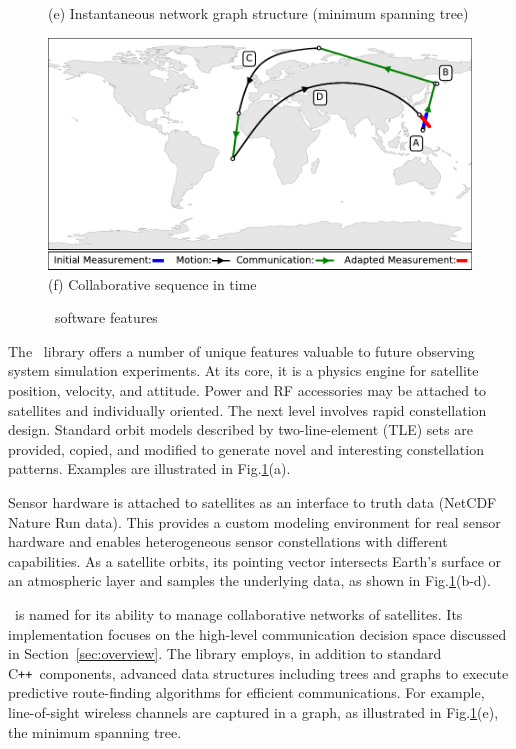 \documentclass[conference]{IEEEtran}
\newcommand{\project}{{\sc{Collaborate}}~}
\newcommand{\cpp}{C\texttt{++}~}
\begin{document}
\begin{figure}[b!]
\begin{minipage}[b]{\linewidth}
\begin{center}
      {\footnotesize(e) Instantaneous network graph structure (minimum spanning
        tree)}
    \end{center}
    \medskip
  \end{minipage}
  \begin{minipage}[b]{\linewidth}
    \begin{center}
      \includegraphics[width=\textwidth]{images/collaborate.pdf}
      {\footnotesize(f) Collaborative sequence in time}
    \end{center}
  \end{minipage}
  \caption{\project software features}
  \label{fig:features}
\end{figure}

The \project library offers a number of unique features valuable to future observing system simulation experiments.  At its core, it is a physics engine for satellite position, velocity, and attitude.  Power and RF accessories may be attached to satellites and individually oriented.  The next level involves rapid constellation design.  Standard orbit models described by two-line-element (TLE) sets are provided, copied, and modified to generate novel and interesting constellation patterns.  Examples are illustrated in Fig.\ref{fig:features}(a).

Sensor hardware is attached to satellites as an interface to truth data (NetCDF Nature Run data).  This provides a custom modeling environment for real sensor hardware and enables heterogeneous sensor constellations with different capabilities.  As a satellite orbits, its pointing vector intersects Earth's surface or an atmospheric layer and samples the underlying data, as shown in Fig.\ref{fig:features}(b-d).

\project is named for its ability to manage collaborative networks of satellites.  Its implementation focuses on the high-level communication decision space discussed in Section~\ref{sec:overview}.  The library employs, in addition to standard \cpp components, advanced data structures including trees and graphs to execute predictive route-finding algorithms for efficient communications.  For example, line-of-sight wireless channels are captured in a graph, as illustrated in Fig.\ref{fig:features}(e), the minimum spanning tree.
\end{document}
